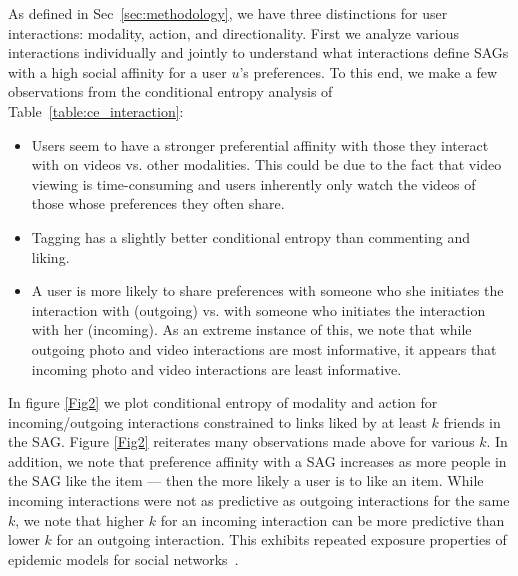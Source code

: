 As defined in Sec~\ref{sec:methodology}, we have three distinctions for user
interactions: modality, action, and directionality.  First we analyze
various interactions individually and jointly to understand what
interactions define SAGs with a high social affinity for a user $u$'s
preferences.  To this end, we make a few observations from the
conditional entropy analysis of Table~\ref{table:ce_interaction}:
\begin{itemize}
\item Users seem to have a stronger preferential affinity with those
  they interact with on videos vs. other modalities.  This could be
  due to the fact that video viewing is time-consuming and users
  inherently only watch the videos of those whose preferences they
  often share.
\item Tagging has a slightly better conditional entropy than
  commenting and liking.%
\item A user is more likely to share preferences with someone who she
  initiates the interaction with (outgoing) vs. with someone who
  initiates the interaction with her (incoming).  As an extreme
  instance of this, we note that while outgoing photo and video
  interactions are most informative, it appears that incoming photo
  and video interactions are least informative.
\end{itemize}

In figure \ref{Fig2} we plot conditional entropy of modality and
action for incoming/outgoing interactions constrained to links
liked by at least $k$ friends in the SAG.  Figure \ref{Fig2} reiterates
many observations made above for various $k$.  In addition, we note that
preference affinity with a SAG increases as more people in the SAG
like the item --- then the more likely a user is to like an item.
While incoming interactions were not as predictive as outgoing
interactions for the same $k$, we note that higher $k$ for an incoming
interaction can be more predictive than lower $k$ for an outgoing
interaction.  This exhibits repeated exposure properties of epidemic
models for social networks~\cite{Golub2010selectionbiase}.



